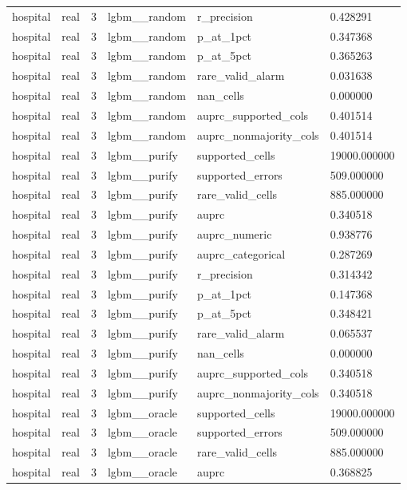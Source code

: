 \begin{tabular}{llllll}
hospital & real & 3 & lgbm\_\_random & r\_precision & 0.428291 \\
hospital & real & 3 & lgbm\_\_random & p\_at\_1pct & 0.347368 \\
hospital & real & 3 & lgbm\_\_random & p\_at\_5pct & 0.365263 \\
hospital & real & 3 & lgbm\_\_random & rare\_valid\_alarm & 0.031638 \\
hospital & real & 3 & lgbm\_\_random & nan\_cells & 0.000000 \\
hospital & real & 3 & lgbm\_\_random & auprc\_supported\_cols & 0.401514 \\
hospital & real & 3 & lgbm\_\_random & auprc\_nonmajority\_cols & 0.401514 \\
hospital & real & 3 & lgbm\_\_purify & supported\_cells & 19000.000000 \\
hospital & real & 3 & lgbm\_\_purify & supported\_errors & 509.000000 \\
hospital & real & 3 & lgbm\_\_purify & rare\_valid\_cells & 885.000000 \\
hospital & real & 3 & lgbm\_\_purify & auprc & 0.340518 \\
hospital & real & 3 & lgbm\_\_purify & auprc\_numeric & 0.938776 \\
hospital & real & 3 & lgbm\_\_purify & auprc\_categorical & 0.287269 \\
hospital & real & 3 & lgbm\_\_purify & r\_precision & 0.314342 \\
hospital & real & 3 & lgbm\_\_purify & p\_at\_1pct & 0.147368 \\
hospital & real & 3 & lgbm\_\_purify & p\_at\_5pct & 0.348421 \\
hospital & real & 3 & lgbm\_\_purify & rare\_valid\_alarm & 0.065537 \\
hospital & real & 3 & lgbm\_\_purify & nan\_cells & 0.000000 \\
hospital & real & 3 & lgbm\_\_purify & auprc\_supported\_cols & 0.340518 \\
hospital & real & 3 & lgbm\_\_purify & auprc\_nonmajority\_cols & 0.340518 \\
hospital & real & 3 & lgbm\_\_oracle & supported\_cells & 19000.000000 \\
hospital & real & 3 & lgbm\_\_oracle & supported\_errors & 509.000000 \\
hospital & real & 3 & lgbm\_\_oracle & rare\_valid\_cells & 885.000000 \\
hospital & real & 3 & lgbm\_\_oracle & auprc & 0.368825 \\

\end{tabular}
